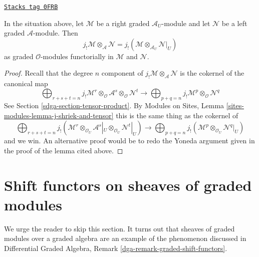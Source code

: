 \begin{lemma}
\label{sdga-lemma-tensor-with-extension-by-zero}
\href{https://stacks.math.columbia.edu/tag/0FRB}{\texttt{Stacks tag 0FRB}}

In the situation above, let $\mathcal{M}$ be a right graded
$\mathcal{A}_U$-module and let $\mathcal{N}$ be a left graded
$\mathcal{A}$-module. Then
$$
j_!\mathcal{M} \otimes_\mathcal{A} \mathcal{N} =
j_!(\mathcal{M} \otimes_{\mathcal{A}_U} \mathcal{N}|_U)
$$
as graded $\mathcal{O}$-modules functorially in $\mathcal{M}$
and $\mathcal{N}$.
\end{lemma}

\begin{proof}
Recall that the degree $n$ component of
$j_!\mathcal{M} \otimes_\mathcal{A} \mathcal{N}$ is the cokernel of
the canonical map
$$
\bigoplus\nolimits_{r + s + t = n}
j_!\mathcal{M}^r \otimes_\mathcal{O}
\mathcal{A}^s \otimes_\mathcal{O}
\mathcal{N}^t
\longrightarrow
\bigoplus\nolimits_{p + q = n}
j_!\mathcal{M}^p \otimes_\mathcal{O} \mathcal{N}^q
$$
See Section \ref{sdga-section-tensor-product}.
By Modules on Sites, Lemma \ref{sites-modules-lemma-j-shriek-and-tensor}
this is the same thing as the cokernel of
$$
\bigoplus\nolimits_{r + s + t = n}
j_!(\mathcal{M}^r \otimes_{\mathcal{O}_U}
\mathcal{A}^s|_U \otimes_{\mathcal{O}_U}
\mathcal{N}^t|_U)
\longrightarrow
\bigoplus\nolimits_{p + q = n}
j_!(\mathcal{M}^p \otimes_{\mathcal{O}_U} \mathcal{N}^q|_U)
$$
and we win. An alternative proof would be to redo the Yoneda
argument given in the proof of the lemma cited above.
\end{proof}

\section{Shift functors on sheaves of graded modules}
\label{sdga-section-shift}
We urge the reader to skip this section. It turns out that sheaves
of graded modules over a graded algebra are an example of the phenomenon
discussed in
Differential Graded Algebra, Remark \ref{dga-remark-graded-shift-functors}.

